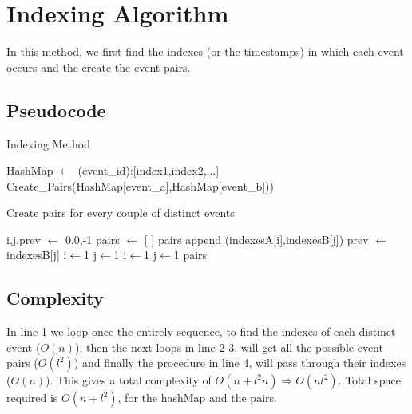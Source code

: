 \documentclass{article}
\begin{document}
\section{Indexing Algorithm}
In this method, we first find the indexes (or the timestamps) in which each event occurs and the create the event pairs. 
\subsection{Pseudocode}
\begin{algorithm}
	\caption{Indexing Method}
	\label{alg:indexing}
	\begin{algorithmic}[1]		
		\State HashMap $\leftarrow$ (event\_id):[index1,index2,...] 
			 
				\State Create\_Pairs(HashMap[event\_a],HashMap[event\_b]))
			\EndFor
		\EndFor
	\end{algorithmic}	
\end{algorithm}

\begin{algorithm}
	\caption{Create pairs for every couple of distinct events}
	\label{alg:pairs}
	\begin{algorithmic}[5]
		 
		\State i,j,prev $\leftarrow$ 0,0,-1
		\State pairs $\leftarrow$ [ ]
		pairs append (indexesA[i],indexesB[j])
		prev $\leftarrow$indexesB[j]
		i$\leftarrow$1
		j$\leftarrow$1
		\Else
		i$\leftarrow$1
		\EndIf
		\Else
		\State j$\leftarrow$1
		\EndIf
		\EndWhile
		\State \Return pairs
		\EndProcedure
	\end{algorithmic}
\end{algorithm}

\subsection{Complexity}
In line 1 we loop once the entirely sequence, to find the indexes of each distinct event ($O(n)$), then the next loops in line 2-3, will get all the possible event pairs ($O(l^2)$) and finally the procedure in line 4, will pass through their indexes ($O(n)$). This gives a total complexity of $O(n+l^2n) \Rightarrow O(nl^2)$. Total space required is $O(n + l^2)$, for the hashMap and the pairs.
\end{document}
